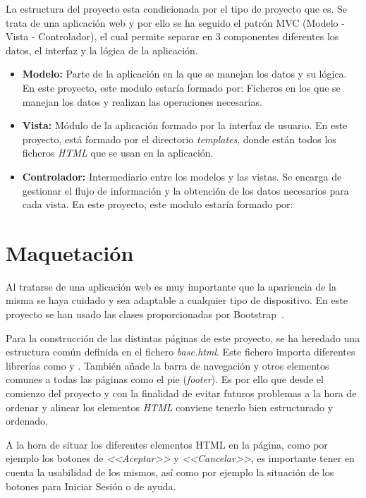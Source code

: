 La estructura del proyecto esta condicionada por el tipo de proyecto que es. Se trata de una aplicación web y por ello se ha seguido el patrón MVC (Modelo - Vista - Controlador), el cual permite separar en 3 componentes diferentes los datos, el interfaz y la lógica de la aplicación. 

\begin{itemize}
	\item \textbf{Modelo:} Parte de la aplicación en la que se manejan los datos y su lógica. En este proyecto, este modulo estaría formado por:
	Ficheros en los que se manejan los datos y realizan las operaciones necesarias.
	\item \textbf{Vista:} Módulo de la aplicación formado por la interfaz de usuario. En este proyecto, está formado por el directorio \textit{templates}, donde están todos los ficheros \textit{HTML} que se usan en la aplicación.
	\item \textbf{Controlador:} Intermediario entre los modelos y las vistas. Se encarga de gestionar el flujo de información y la obtención de los datos necesarios para cada vista. En este proyecto, este modulo estaría formado por:
\end{itemize}


\section{Maquetación}
Al tratarse de una aplicación web es muy importante que la apariencia de la misma se haya cuidado y sea adaptable a cualquier tipo de dispositivo. En este proyecto se han usado las clases proporcionadas por Bootstrap~\cite{doc:bootstrap}.


Para la construcción de las distintas páginas de este proyecto, se ha heredado una estructura común definida en el fichero \textit{base.html}. Este fichero importa diferentes librerías como  y . También añade la barra de navegación y otros elementos comunes a todas las páginas como el pie (\textit{footer}). Es por ello que desde el comienzo del proyecto y con la finalidad de evitar futuros problemas a la hora de ordenar y alinear los elementos \textit{HTML} conviene tenerlo bien estructurado y ordenado. 


A la hora de situar los diferentes elementos HTML en la página, como por ejemplo los botones de \textit{<<Aceptar>>} y \textit{<<Cancelar>>}, es importante tener en cuenta la usabilidad de los mismos, así como por ejemplo la situación de los botones para Iniciar Sesión o de ayuda.

